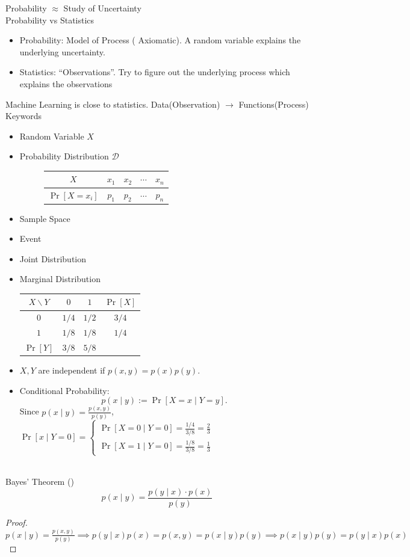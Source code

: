 \documentclass[12pt,openany]{book}
\theoremstyle{definition}
\begin{document}
	Probability $\approx$ Study of Uncertainty
	\\
	Probability vs Statistics
	\begin{itemize}
		\item Probability: Model of Process ( Axiomatic). A random variable explains the underlying uncertainty.
		\item Statistics: ``Observations''. Try to figure out the underlying process which explains the observations
	\end{itemize}
	Machine Learning is close to statistics. Data(Observation) $\to$ Functions(Process)
	\\
	Keywords
	\begin{itemize}
		\item Random Variable $X$
		\item Probability Distribution $\mathcal{D}$
		\begin{figure}[h!]\centering
			\begin{tabular}{c|cccc}
				$X$ & $x_1$ & $x_2$ & $\cdots$ & $x_n$\\
				\hline
				$\Pr[X=x_i]$ & $p_1$ & $p_2$ & $\cdots$ & $p_n$
			\end{tabular}
		\end{figure}
		\item Sample Space
		\item Event
		\item Joint Distribution
		\item Marginal Distribution\begin{center}
			\begin{tabular}{c|cc|c}
				$X\backslash Y$ & $0$ & $1$ & $\Pr[X]$\\
				\hline
				$0$ & $1/4$ & $1/2$ & $3/4$\\
				$1$ & $1/8$ & $1/8$ & $1/4$\\
				\hline
				$\Pr[Y]$ & $3/8$ & $5/8$ &
			\end{tabular}
		\end{center}
		\item $X,Y$ are independent if $p(x,y)=p(x)p(y)$.
		\item Conditional Probability: \[
		p(x\mid y):=\Pr[X=x\mid Y=y].
		\] Since $p(x\mid y)=\frac{p(x,y)}{p(y)}$, $\Pr[x\mid Y=0]=\begin{cases}
			\Pr[X=0\mid Y=0]=\frac{1/4}{3/8}=\frac{2}{3}\\
			\Pr[X=1\mid Y=0]=\frac{1/8}{3/8}=\frac{1}{3}
		\end{cases}$
	\end{itemize}
	\ \\
	Bayes' Theorem () \[
	p(x\mid y)=\frac{p(y\mid x)\cdot p(x)}{p(y)}
	\]
	\begin{proof}
		$p(x\mid y)=\frac{p(x,y)}{p(y)}\implies p(y\mid x)p(x)=p(x,y)=p(x\mid y)p(y)\implies p(x\mid y)p(y)=p(y\mid x)p(x)$
	\end{proof}
\end{document}
